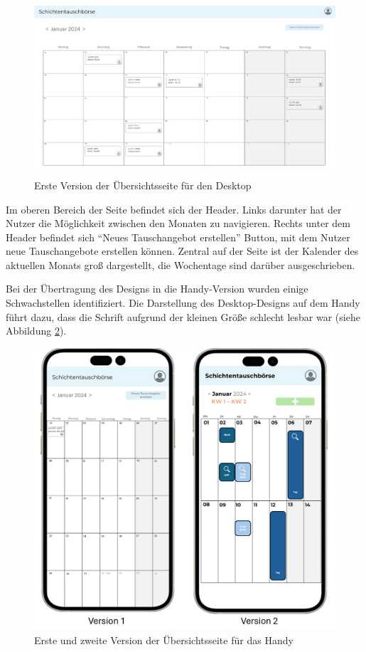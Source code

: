 \begin{figure}[h]
    \centering
    \includegraphics[clip,width=0.9\linewidth]{images/Version1_Desktop.png}
    \caption[Erste Version der Übersichtsseite für den Desktop]{Erste Version der Übersichtsseite für den Desktop}
    \label{Version1_Desktop}
\end{figure}

Im oberen Bereich der Seite befindet sich der Header. 
Links darunter hat der Nutzer die Möglichkeit zwischen den Monaten zu navigieren. 
Rechts unter dem Header befindet sich “Neues Tauschangebot erstellen” Button, mit dem Nutzer neue Tauschangebote erstellen können. 
Zentral auf der Seite ist der Kalender des aktuellen Monats groß dargestellt, die Wochentage sind darüber ausgeschrieben.

Bei der Übertragung des Designs in die Handy-Version wurden einige Schwachstellen identifiziert. Die Darstellung des Desktop-Designs auf dem Handy führt dazu, dass die Schrift aufgrund der kleinen Größe schlecht lesbar war (siehe Abbildung \ref{Version12_Handy}). 

\begin{figure}[h]
    \centering
    \includegraphics[clip,width=0.75\linewidth]{images/Version12_Handy.png}
    \caption[Erste und zweite Version der Übersichtsseite für das Handy]{Erste und zweite Version der Übersichtsseite für das Handy}
    \label{Version12_Handy}
\end{figure}

